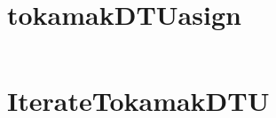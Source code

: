 \appendix
\appendixpage
\addappheadtotoc
\section{tokamakDTU\textunderscore asign}\label{tokamakDTU_asign_1}
\inputminted[bgcolor=Black,linenos=true]{python}{Listings/tokamakDTU_asign_1.m}
\section{IterateTokamakDTU}\label{IterateTokamakDTU}
\inputminted[bgcolor=Black,linenos=true]{python}{Listings/IterateTokamakDTU.m}
